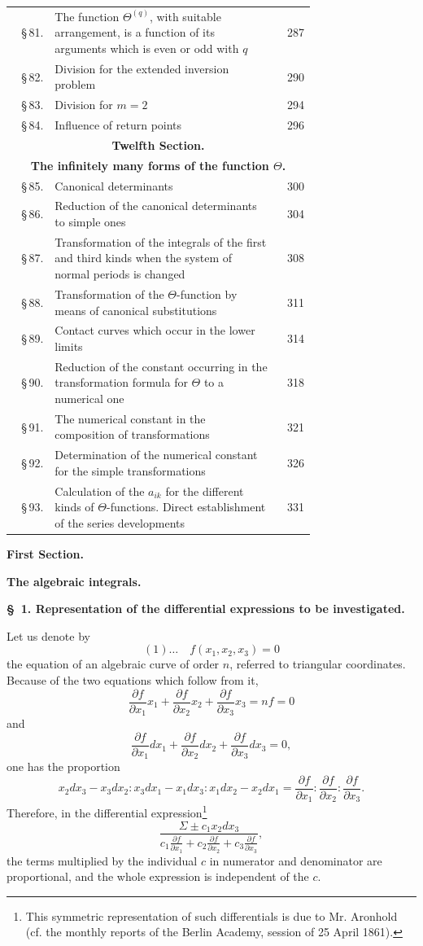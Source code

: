 \documentclass[10pt]{article}
\newcommand{\tocentry}[3]{\S\,#1 & #2 & #3\\}
\newcommand{\tocsec}[2]{\multicolumn{3}{c}{\bfseries #1}\\[-0.15em]\multicolumn{3}{c}{\bfseries #2}\\[0.25em]}
\begin{document}
{\begin{longtable}{@{}r@{\ }p{0.74\linewidth}@{\ }r@{}}
\tocentry{81.}{The function $\Theta^{(q)}$, with suitable arrangement, is a function of its arguments which is even or odd with $q$}{287}
\tocentry{82.}{Division for the extended inversion problem}{290}
\tocentry{83.}{Division for $m=2$}{294}
\tocentry{84.}{Influence of return points}{296}
\tocsec{Twelfth Section.}{The infinitely many forms of the function $\Theta$.}
\tocentry{85.}{Canonical determinants}{300}
\tocentry{86.}{Reduction of the canonical determinants to simple ones}{304}
\tocentry{87.}{Transformation of the integrals of the first and third kinds when the system of normal periods is changed}{308}
\tocentry{88.}{Transformation of the $\Theta$-function by means of canonical substitutions}{311}
\tocentry{89.}{Contact curves which occur in the lower limits}{314}
\tocentry{90.}{Reduction of the constant occurring in the transformation formula for $\Theta$ to a numerical one}{318}
\tocentry{91.}{The numerical constant in the composition of transformations}{321}
\tocentry{92.}{Determination of the numerical constant for the simple transformations}{326}
\tocentry{93.}{Calculation of the $a_{ik}$ for the different kinds of $\Theta$-functions. Direct establishment of the series developments}{331}
\end{longtable}}

\begin{center}
{\large\bfseries First Section.}\par
{\Large\bfseries The algebraic integrals.}
\end{center}

\begin{center}
{\bfseries \S\ 1. Representation of the differential expressions to be investigated.}
\end{center}

Let us denote by
\[
(1)\ldots\quad f(x_1,x_2,x_3)=0
\]
the equation of an algebraic curve of order $n$, referred to triangular coordinates. Because of the two equations which follow from it,
\[
\frac{\partial f}{\partial x_1}x_1+\frac{\partial f}{\partial x_2}x_2+\frac{\partial f}{\partial x_3}x_3=nf=0
\]
and
\[
\frac{\partial f}{\partial x_1}dx_1+\frac{\partial f}{\partial x_2}dx_2+\frac{\partial f}{\partial x_3}dx_3=0,
\]
one has the proportion
\[
x_2dx_3-x_3dx_2:x_3dx_1-x_1dx_3:x_1dx_2-x_2dx_1
=\frac{\partial f}{\partial x_1}:\frac{\partial f}{\partial x_2}:\frac{\partial f}{\partial x_3}.
\]
Therefore, in the differential expression\footnote{This symmetric representation of such differentials is due to Mr. Aronhold (cf. the monthly reports of the Berlin Academy, session of 25 April 1861).}
\[
\frac{\Sigma\pm c_1x_2dx_3}{c_1\frac{\partial f}{\partial x_1}+c_2\frac{\partial f}{\partial x_2}+c_3\frac{\partial f}{\partial x_3}},
\]
the terms multiplied by the individual $c$ in numerator and denominator are proportional, and the whole expression is independent of the $c$.
\end{document}
